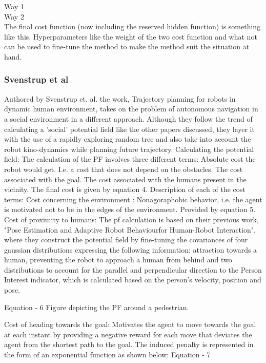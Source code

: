 Way 1\\
Way 2\\

The final cost function (now including the reserved hidden function) is something like this.
Hyperparameters like the weight of the two cost function and what not can be used to fine-tune the method to make the method suit the situation at hand.

\subsubsection*{Svenstrup et al}
Authored by Svenstrup et. al. the work, Trajectory planning for robots in dynamic human environment, takes on the problem of autonomous navigation in a social environment in a different approach. Although they follow the trend of calculating a 'social' potential field like the other papers discussed, they layer it with the use of a rapidly exploring random tree and also take into account the robot kino-dynamics while planning future trajectory.
Calculating the potential field:
The calculation of the PF involves three different terms:
Absolute cost the robot would get. I.e. a cost that does not depend on the obstacles.	
The cost associated with the goal.
The cost associated with the humans present in the vicinity.
The final cost is given by equation 4.
Description of each of the cost terms:
Cost concerning the environment :
Nonagoraphobic behavior,  i.e. the agent is motivated not to be in the edges of the environment. Provided by equation 5.
Cost of proximity to humans:
The pf calculation is based on their previous work, "Pose Estimation and Adaptive Robot Behaviourfor Human-Robot Interaction", where they construct the potential field by fine-tuning the covariances of four gaussian distributions expressing the following information: attraction towards a human, preventing the robot to approach a human from behind and two distributions to account for the parallel and perpendicular direction to the Person Interest indicator, which is calculated based on the person's velocity, position and pose.  

Equation - 6
Figure depicting the PF around a pedestrian.

Cost of heading towards the goal:
Motivates the agent to move towards the goal at each instant by providing a  negative reward for each move that deviates the agent from the shortest path to the goal. The induced penalty is represented in the form of an exponential function as shown below:
Equation - 7

